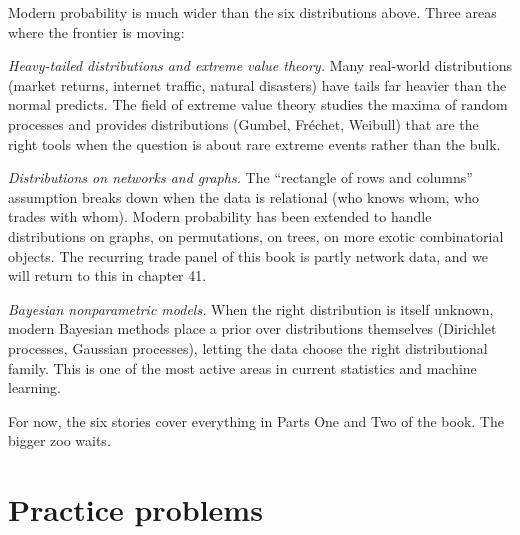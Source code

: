 \documentclass[
  letterpaper,
  11pt,
  twoside,
  openany]{scrbook}
\begin{document}
\begin{tcolorbox}[enhanced jigsaw, arc=.35mm, bottomrule=.15mm, bottomtitle=1mm, breakable, colback=white, colbacktitle=quarto-callout-important-color!10!white, colframe=quarto-callout-important-color-frame, coltitle=black, left=2mm, leftrule=.75mm, opacityback=0, opacitybacktitle=0.6, rightrule=.15mm, title=\textcolor{quarto-callout-important-color}{\faExclamation}\hspace{0.5em}{Frontier note}, titlerule=0mm, toprule=.15mm, toptitle=1mm]

Modern probability is much wider than the six distributions above. Three
areas where the frontier is moving:

\emph{Heavy-tailed distributions and extreme value theory.} Many
real-world distributions (market returns, internet traffic, natural
disasters) have tails far heavier than the normal predicts. The field of
extreme value theory studies the maxima of random processes and provides
distributions (Gumbel, Fréchet, Weibull) that are the right tools when
the question is about rare extreme events rather than the bulk.

\emph{Distributions on networks and graphs.} The ``rectangle of rows and
columns'' assumption breaks down when the data is relational (who knows
whom, who trades with whom). Modern probability has been extended to
handle distributions on graphs, on permutations, on trees, on more
exotic combinatorial objects. The recurring trade panel of this book is
partly network data, and we will return to this in chapter 41.

\emph{Bayesian nonparametric models.} When the right distribution is
itself unknown, modern Bayesian methods place a prior over distributions
themselves (Dirichlet processes, Gaussian processes), letting the data
choose the right distributional family. This is one of the most active
areas in current statistics and machine learning.

For now, the six stories cover everything in Parts One and Two of the
book. The bigger zoo waits.

\end{tcolorbox}

\section{Practice problems}\label{practice-problems-2}
\end{document}
